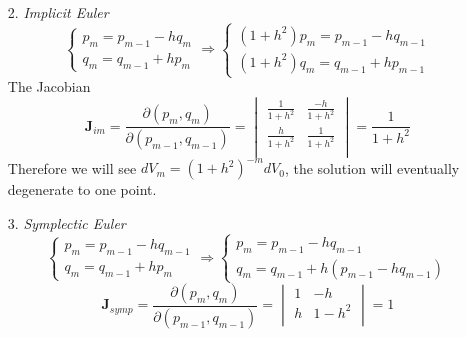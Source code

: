 \documentclass[a4paper, 11pt]{article}
\begin{document}
\begin{itemize}
\begin{itemize}
		\item[2.] \emph{Implicit Euler}
		\begin{equation}
			\begin{cases}
			p_m = p_{m-1} - hq_{m} \\
			q_m = q_{m-1} + hp_{m}
			\end{cases} \Rightarrow
			\begin{cases}
			(1+h^2)p_m = p_{m-1} - hq_{m-1} \\
			(1+h^2)q_m = q_{m-1} + hp_{m-1}
			\end{cases}
		\end{equation}
		The Jacobian 
		$$
		\bm{J}_{im} = \frac{\partial (p_m, q_m)}{\partial (p_{m-1}, q_{m-1})} = 
		\begin{vmatrix}
			\frac{1}{1+h^2} & \frac{-h}{1+h^2} \\
			\frac{h}{1+h^2} & \frac{1}{1+h^2}\\
		\end{vmatrix} = \frac{1}{1+h^2}
		$$
		Therefore we will see $dV_m = (1+h^2)^{-m}dV_0$, the solution will eventually degenerate to one point.

		\item[3.] \emph{Symplectic Euler}
		\begin{equation}
			\begin{cases}
			p_m = p_{m-1} - hq_{m-1} \\
			q_m = q_{m-1} + hp_{m}
			\end{cases} \Rightarrow
			\begin{cases}
			p_m = p_{m-1} - hq_{m-1} \\
			q_m = q_{m-1} + h(p_{m-1} - hq_{m-1})
			\end{cases}
		\end{equation}
		$$
		\bm{J}_{symp} = \frac{\partial (p_m, q_m)}{\partial (p_{m-1}, q_{m-1})} = 
		\begin{vmatrix}
			1 & -h \\
			h & 1-h^2\\
		\end{vmatrix} = 1
		$$


\end{itemize}
\end{itemize}
\end{document}
